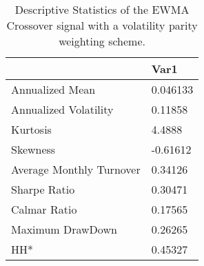 \begin{table}[H]
\centering
\begin{tabular}{ll}
& Var1 \\ 
\hline 
Annualized Mean & 0.046133 \\ 
Annualized Volatility & 0.11858 \\ 
Kurtosis & 4.4888 \\ 
Skewness & -0.61612 \\ 
Average Monthly Turnover & 0.34126 \\ 
Sharpe Ratio & 0.30471 \\ 
Calmar Ratio & 0.17565 \\ 
Maximum DrawDown & 0.26265 \\ 
HH* & 0.45327 \\ 
\hline
\end{tabular}
\caption{Descriptive Statistics of the EWMA Crossover signal with a volatility parity weighting scheme.}
\label{MBBS2}
\end{table}